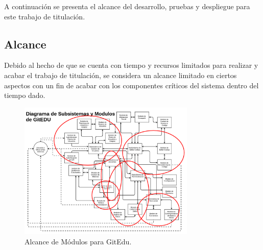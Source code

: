 A continuación se presenta el alcance del desarrollo, pruebas y despliegue para este trabajo de titulación.

\subsection{Alcance}

Debido al hecho de que se cuenta con tiempo y recursos limitados para realizar y acabar el trabajo de titulación, se considera un alcance limitado en ciertos aspectos con un fin de acabar con los componentes críticos del sistema dentro del tiempo dado.

\begin{figure}
  \begin{center}
    \includegraphics[width=0.75\textwidth]{Figures/alc_mod_ge.png}
  \end{center}
  \caption{Alcance de Módulos para GitEdu.}
  \label{alc_mod_ge}
\end{figure}

